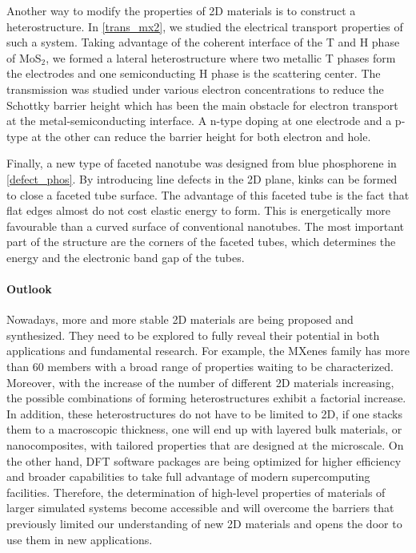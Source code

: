 Another way to modify the properties of 2D materials is to construct a heterostructure. In \autoref{trans_mx2}, we studied the electrical transport properties of such a system. Taking advantage of the coherent interface of the T and H phase of MoS$_2$, we formed a lateral heterostructure where two metallic T phases form the electrodes and one semiconducting H phase is the scattering center. The transmission was studied under various electron concentrations to reduce the Schottky barrier height which has been the main obstacle for electron transport at the metal-semiconducting interface. A n-type doping at one electrode and a p-type at the other can reduce the barrier height for both electron and hole. 

Finally, a new type of faceted nanotube was designed from blue phosphorene in \autoref{defect_phos}. By introducing line defects in the 2D plane, kinks can be formed to close a faceted tube surface. The advantage of this faceted tube is the fact that flat edges almost do not cost elastic energy to form. This is energetically more favourable than a curved surface of conventional nanotubes. The most important part of the structure are the corners of the faceted tubes, which determines the energy and the electronic band gap of the tubes.

\paragraph{Outlook} Nowadays, more and more stable 2D materials are being proposed and synthesized. They need to be explored to fully reveal their potential in both applications and fundamental research. For example, the MXenes family has more than 60 members with a broad range of properties waiting to be characterized. Moreover, with the increase of the number of different 2D materials increasing, the possible combinations of forming heterostructures exhibit a factorial increase. In addition, these heterostructures do not have to be limited to 2D, if one stacks them to a macroscopic thickness, one will end up with layered bulk materials, or nanocomposites, with tailored properties that are designed at the microscale. On the other hand, DFT software packages are being optimized for higher efficiency and broader capabilities to take full advantage of modern supercomputing facilities. Therefore, the determination of high-level properties of materials of larger simulated systems become accessible and will overcome the barriers that previously limited our understanding of new 2D materials and opens the door to use them in new applications.